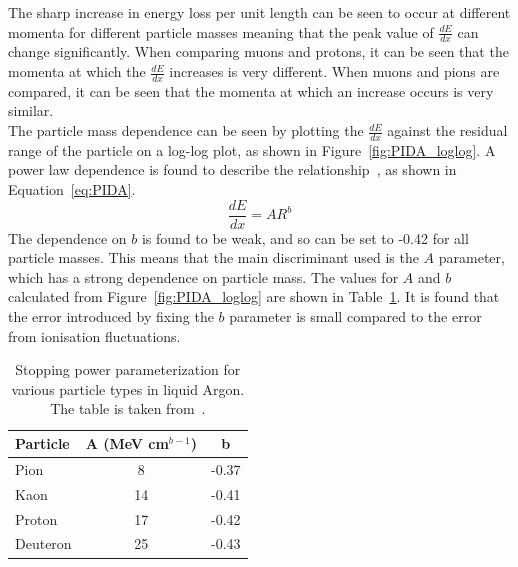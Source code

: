 The sharp increase in energy loss per unit length can be seen to occur at different momenta for different particle masses meaning that the peak value of $\frac{dE}{dx}$ can change significantly. When comparing muons and protons, it can be seen that the momenta at which the $\frac{dE}{dx}$ increases is very different. When muons and pions are compared, it can be seen that the momenta at which an increase occurs is very similar. \\

The particle mass dependence can be seen by plotting the $\frac{dE}{dx}$ against the residual range of the particle on a log-log plot, as shown in Figure~\ref{fig:PIDA_loglog}. A power law dependence is found to describe the relationship~\citep{PIDA_Paper}, as shown in Equation~\ref{eq:PIDA}.
\begin{equation}
  \label{eq:PIDA}
  \frac{dE}{dx} = A R^b
\end{equation}
The dependence on $b$ is found to be weak, and so can be set to -0.42 for all particle masses. This means that the main discriminant used is the $A$ parameter, which has a strong dependence on particle mass. The values for $A$ and $b$ calculated from Figure~\ref{fig:PIDA_loglog} are shown in Table~\ref{tab:PIDAVals}. It is found that the error introduced by fixing the $b$ parameter is small compared to the error from ionisation fluctuations. \\

\begin{table}
\caption[Stopping power parameterization for various particle types in liquid Argon]
        {Stopping power parameterization for various particle types in liquid Argon. The table is taken from~\citep{PIDA_Paper}.}
\centering
\label{tab:PIDAVals}
\begin{tabular}{l c c}
\toprule
{Particle} & {A (MeV cm$^{b-1}$)} & {b} \\ 
\midrule
Pion     & 8  & -0.37 \\

Kaon     & 14 & -0.41 \\

Proton   & 17 & -0.42 \\

Deuteron & 25 & -0.43 \\
\bottomrule
\end{tabular}
\end{table}

